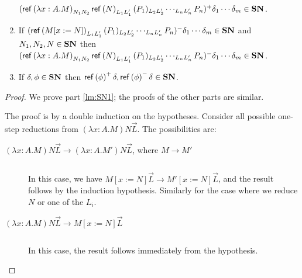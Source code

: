 \begin{lemma}
\begin{enumerate}
$(\mathsf{ref} \left( {\lambda x:A.M} \right)_{N_1 N_2}\mathsf{ref} \left( {N} \right)_{L_1 L_1'} (P_1)_{L_2 L_2'} \cdots_{L_n L_n'} P_n)^+ \delta_1 \cdots \delta_m \in \mathbf{SN}$.
\item
If $(\mathsf{ref} \left( {M[x:=N]} \right)_{L_1 L_1'} (P_1)_{L_2 L_2'} \cdots_{L_n L_n'} P_n)^- \delta_1 \cdots \delta_m \in \mathbf{SN}$ and $N_1, N_2, N \in \mathbf{SN}$ then \\
$(\mathsf{ref} \left( {\lambda x:A.M} \right)_{N_1 N_2}\mathsf{ref} \left( {N} \right)_{L_1 L_1'} (P_1)_{L_2 L_2'} \cdots_{L_n L_n'} P_n)^- \delta_1 \cdots \delta_m \in \mathbf{SN}$.
\item
\label{lm:SN5}
If $\delta, \phi \in \mathbf{SN}$ then $\mathsf{ref} \left( {\phi} \right)^+ \delta, \mathsf{ref} \left( {\phi} \right)^- \delta \in \mathbf{SN}$.
\end{enumerate}
\end{lemma}

\begin{proof}
We prove part \ref{lm:SN1}; the proofs of the other parts are similar.

The proof is by a double induction on the hypotheses.  Consider all possible one-step reductions from $(\lambda x:A.M) N \vec{L}$.  The possibilities are:
\begin{description}
\item[$(\lambda x:A.M) N \vec{L} \rightarrow (\lambda x:A.M')N \vec{L}$, where $M \rightarrow M'$]
$ $

In this case, we have $M[x:=N] \vec{L} \rightarrow M'[x:=N] \vec{L}$, and the result follows by the induction hypothesis.  Similarly for the case
where we reduce $N$ or one of the $L_i$.
\item[$(\lambda x:A.M)N \vec{L} \rightarrow M{[x:=N]} \vec{L}$]
$ $

In this case, the result follows immediately from the hypothesis.
\end{description}
\end{proof}




